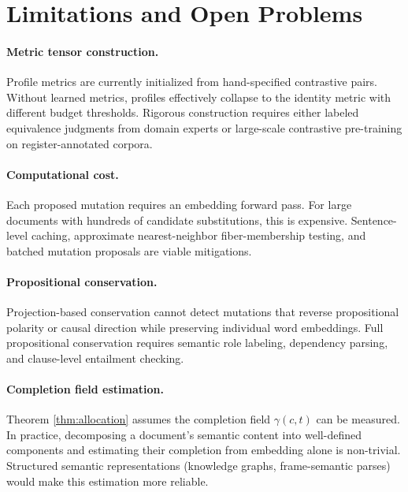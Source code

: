 \documentclass[12pt, a4paper]{article}
\theoremstyle{plain}
\theoremstyle{definition}
\theoremstyle{remark}
\begin{document}
\section{Limitations and Open Problems}
\label{sec:limitations}

\paragraph{Metric tensor construction.}
Profile metrics are currently initialized from hand-specified contrastive pairs.
Without learned metrics, profiles effectively collapse to the identity metric
with different budget thresholds.  Rigorous construction requires either labeled
equivalence judgments from domain experts or large-scale contrastive pre-training
on register-annotated corpora.

\paragraph{Computational cost.}
Each proposed mutation requires an embedding forward pass.  For large documents
with hundreds of candidate substitutions, this is expensive.  Sentence-level
caching, approximate nearest-neighbor fiber-membership testing, and batched
mutation proposals are viable mitigations.

\paragraph{Propositional conservation.}
Projection-based conservation cannot detect mutations that reverse propositional
polarity or causal direction while preserving individual word embeddings.  Full
propositional conservation requires semantic role labeling, dependency parsing,
and clause-level entailment checking.

\paragraph{Completion field estimation.}
Theorem \ref{thm:allocation} assumes the completion field $\gamma(c, t)$ can
be measured.  In practice, decomposing a document's semantic content into
well-defined components and estimating their completion from embedding alone is
non-trivial.  Structured semantic representations (knowledge graphs,
frame-semantic parses) would make this estimation more reliable.
\end{document}
